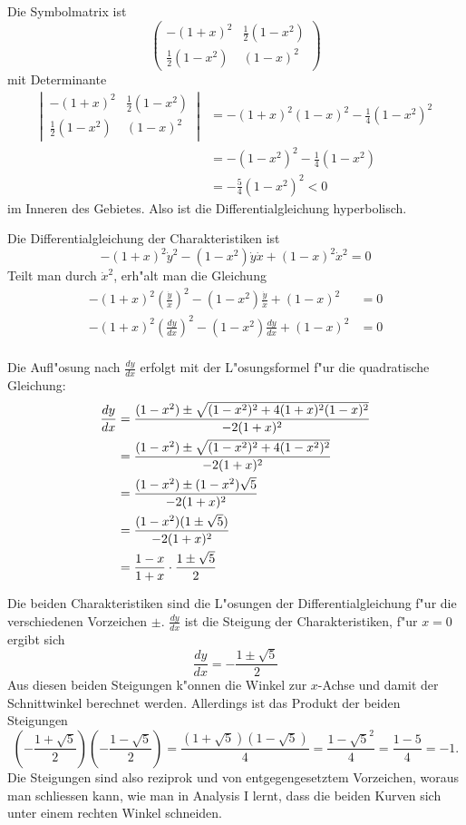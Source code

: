 \begin{loesung}
\begin{teilaufgaben}
\item Die Symbolmatrix ist
\[
\begin{pmatrix}
-(1+x)^2&\frac12(1-x^2)\\
\frac12(1-x^2)&(1-x)^2
\end{pmatrix}
\]
mit Determinante
\begin{align*}
\left|\,\begin{matrix}
-(1+x)^2&\frac12(1-x^2)\\
\frac12(1-x^2)&(1-x)^2
\end{matrix}\,\right|&=
-(1+x)^2(1-x)^2-\frac14(1-x^2)^2
\\
&=-(1-x^2)^2-\frac14(1-x^2)
\\
&=-\frac54(1-x^2)^2<0
\end{align*}
im Inneren des Gebietes. Also ist die Differentialgleichung hyperbolisch.
\item Die Differentialgleichung der Charakteristiken ist
\[
-(1+x)^2\dot y^2-(1-x^2)\dot y\dot x+(1-x)^2\dot x^2=0
\]
Teilt man durch $\dot x^2$, erh"alt man die Gleichung
\begin{align*}
-(1+x)^2\left(\frac{\dot y}{\dot x}\right)^2
-(1-x^2)\frac{\dot y}{\dot x}
+(1-x)^2&=0\\
-(1+x)^2\left(\frac{dy}{dx}\right)^2
-(1-x^2)\frac{dy}{dx}
+(1-x)^2&=0\\
\end{align*}
\item Die Aufl"osung nach $\frac{dy}{dx}$ erfolgt mit der L"osungsformel
f"ur die quadratische Gleichung:
\begin{align*}
\frac{dy}{dx}
&=
\frac{(1-x^2)\pm\sqrt{(1-x^2)^2+4(1+x)^2(1-x)^2}}{-2(1+x)^2}
\\
&=
\frac{(1-x^2)\pm\sqrt{(1-x^2)^2+4(1-x^2)^2}}{-2(1+x)^2}
\\
&=
\frac{(1-x^2)\pm(1-x^2)\sqrt{5}}{-2(1+x)^2}
\\
&=
\frac{(1-x^2)(1\pm\sqrt{5})}{-2(1+x)^2}
\\
&=
\-\frac{1-x}{1+x}\cdot\frac{1\pm\sqrt{5}}{2}
\end{align*}
\item
Die beiden Charakteristiken sind die L"osungen der Differentialgleichung
f"ur die verschiedenen Vorzeichen $\pm$. $\frac{dy}{dx}$ ist die
Steigung der Charakteristiken, f"ur $x=0$ ergibt sich
\[
\frac{dy}{dx}
=
-\frac{1\pm\sqrt{5}}{2}
\]
Aus diesen beiden Steigungen
k"onnen die Winkel zur $x$-Achse und damit der Schnittwinkel
berechnet werden. Allerdings ist das Produkt der beiden Steigungen
\[
\left(-\frac{1+\sqrt{5}}{2}\right)
\left(-\frac{1-\sqrt{5}}{2}\right)
=\frac{(1+\sqrt{5})(1-\sqrt{5})}{4}=
\frac{1-\sqrt{5}^2}{4}=\frac{1-5}{4}
=-1.
\]
Die Steigungen sind also reziprok und von entgegengesetztem Vorzeichen,
woraus man schliessen kann, wie man in Analysis I lernt, dass die
beiden Kurven sich unter einem rechten Winkel schneiden.
\qedhere
\end{teilaufgaben}
\end{loesung}
